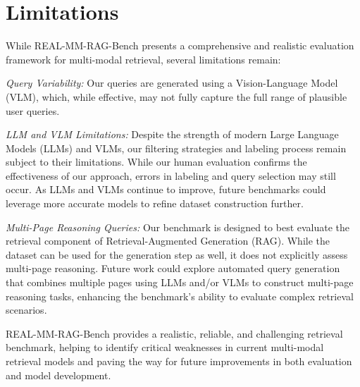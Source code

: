 
\clearpage
\section{Limitations} \label{sec:limitations}

While REAL-MM-RAG-Bench presents a comprehensive and realistic evaluation framework for multi-modal retrieval, several limitations remain:

\noindent
\emph{Query Variability:} Our queries are generated using a Vision-Language Model (VLM), which, while effective, may not fully capture the full range of plausible user queries.

\noindent
\emph{LLM and VLM Limitations:} Despite the strength of modern Large Language Models (LLMs) and VLMs, our filtering strategies and labeling process remain subject to their limitations. While our human evaluation confirms the effectiveness of our approach, errors in labeling and query selection may still occur. As LLMs and VLMs continue to improve, future benchmarks could leverage more accurate models to refine dataset construction further.

\noindent
\emph{Multi-Page Reasoning Queries:} Our benchmark is designed to best evaluate the retrieval component of Retrieval-Augmented Generation (RAG). While the dataset can be used for the generation step as well, it does not explicitly assess multi-page reasoning. Future work could explore automated query generation that combines multiple pages using LLMs and/or VLMs to construct multi-page reasoning tasks, enhancing the benchmark’s ability to evaluate complex retrieval scenarios.

\noindent
REAL-MM-RAG-Bench provides a realistic, reliable, and challenging retrieval benchmark, helping to identify critical weaknesses in current multi-modal retrieval models and paving the way for future improvements in both evaluation and model development.
